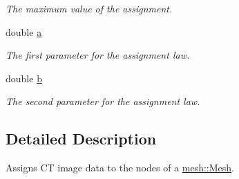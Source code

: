 \begin{DoxyCompactItemize}
\begin{DoxyCompactList}\small\item\em The maximum value of the assignment. \item\end{DoxyCompactList}\item 
\hypertarget{classassignment_1_1_node_property_assigner_a7bac7369b89b3351b2ff889114daaf6a}{
double \hyperlink{classassignment_1_1_node_property_assigner_a7bac7369b89b3351b2ff889114daaf6a}{a}}
\label{classassignment_1_1_node_property_assigner_a7bac7369b89b3351b2ff889114daaf6a}

\begin{DoxyCompactList}\small\item\em The first parameter for the assignment law. \item\end{DoxyCompactList}\item 
\hypertarget{classassignment_1_1_node_property_assigner_a8d2dcf867efc99c60f076cc5d1d55114}{
double \hyperlink{classassignment_1_1_node_property_assigner_a8d2dcf867efc99c60f076cc5d1d55114}{b}}
\label{classassignment_1_1_node_property_assigner_a8d2dcf867efc99c60f076cc5d1d55114}

\begin{DoxyCompactList}\small\item\em The second parameter for the assignment law. \item\end{DoxyCompactList}\end{DoxyCompactItemize}


\subsection{Detailed Description}
Assigns CT image data to the nodes of a \hyperlink{classmesh_1_1_mesh}{mesh::Mesh}. 

